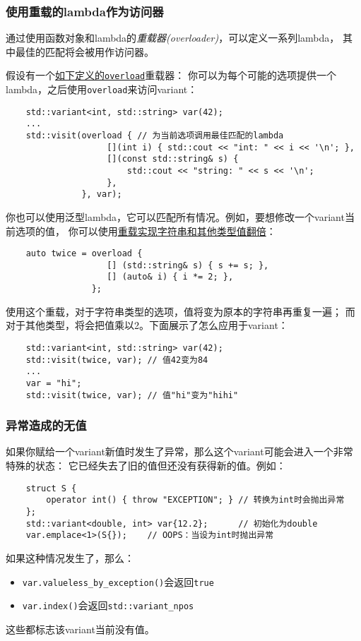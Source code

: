 \subsubsection*{使用重载的lambda作为访问器}\label{ch16.3.3.4}
通过使用函数对象和lambda的\emph{重载器(overloader)}，可以定义一系列lambda，
其中最佳的匹配将会被用作访问器。

假设有一个\hyperref[ch14.1]{如下定义的\texttt{overload}}重载器：
你可以为每个可能的选项提供一个lambda，之后使用\texttt{overload}来访问variant：
\begin{lstlisting}
    std::variant<int, std::string> var(42);
    ...
    std::visit(overload { // 为当前选项调用最佳匹配的lambda
                    [](int i) { std::cout << "int: " << i << '\n'; },
                    [](const std::string& s) {
                        std::cout << "string: " << s << '\n';
                    },
               }, var);
\end{lstlisting}
你也可以使用泛型lambda，它可以匹配所有情况。例如，要想修改一个variant当前选项的值，
你可以使用\hyperref[重载的两倍lambda]{重载实现字符串和其他类型值翻倍}：
\begin{lstlisting}
    auto twice = overload {
                    [] (std::string& s) { s += s; },
                    [] (auto& i) { i *= 2; },
                 };
\end{lstlisting}
使用这个重载，对于字符串类型的选项，值将变为原本的字符串再重复一遍；
而对于其他类型，将会把值乘以2。下面展示了怎么应用于variant：
\begin{lstlisting}
    std::variant<int, std::string> var(42);
    std::visit(twice, var); // 值42变为84
    ...
    var = "hi";
    std::visit(twice, var); // 值"hi"变为"hihi"
\end{lstlisting}

\subsubsection{异常造成的无值}\label{ch16.3.4}
如果你赋给一个variant新值时发生了异常，那么这个variant可能会进入一个非常特殊的状态：
它已经失去了旧的值但还没有获得新的值。例如：
\begin{lstlisting}
    struct S {
        operator int() { throw "EXCEPTION"; } // 转换为int时会抛出异常
    };
    std::variant<double, int> var{12.2};      // 初始化为double
    var.emplace<1>(S{});    // OOPS：当设为int时抛出异常
\end{lstlisting}
如果这种情况发生了，那么：
\begin{itemize}[leftmargin=*]
    \item \texttt{var.valueless\_by\_exception()}会返回\texttt{true}
    \item \texttt{var.index()}会返回\texttt{std::variant\_npos}
\end{itemize}
这些都标志该variant当前没有值。

